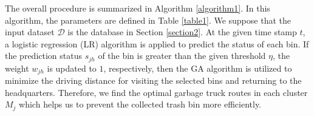 \documentclass[conference]{IEEEtran}
\begin{document}
\par  The overall procedure is summarized in Algorithm \ref{algorithm1}. In this algorithm, the parameters are defined in Table \ref{table1}. We suppose that the input dataset $\mathcal{D}$ is the database in Section \ref{section2}. At the given time stamp $t$, a logistic regression (LR) algorithm is applied to predict the status of each bin. If the prediction status $s_{jh}$ of the bin is greater than the given threshold $\eta$, the weight $w_{jh}$ is updated to $1$, respectively, then the GA algorithm is utilized to minimize the driving distance for visiting the selected bins and returning to the headquarters. Therefore, we find the optimal garbage truck routes in each cluster $M_j$ which helps us to prevent the collected trash bin more efficiently.
\end{document}
